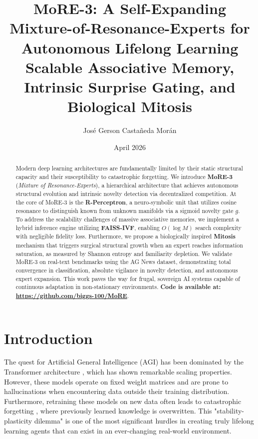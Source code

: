 \documentclass[11pt,hidelinks]{article}
\title{\LARGE\bfseries\textcolor{accent}{MoRE-3: A Self-Expanding Mixture-of-Resonance-Experts for Autonomous Lifelong Learning} \\
\large Scalable Associative Memory, Intrinsic Surprise Gating, and Biological Mitosis}
\author{
  José Gerson Castañeda Morán
}
\date{April 2026}
\begin{document}
\maketitle

\begin{abstract}
\noindent 
Modern deep learning architectures are fundamentally limited by their static structural capacity and their susceptibility to catastrophic forgetting. We introduce \textbf{MoRE-3} (\textit{Mixture of Resonance-Experts}), a hierarchical architecture that achieves autonomous structural evolution and intrinsic novelty detection via decentralized competition. At the core of MoRE-3 is the \textbf{R-Perceptron}, a neuro-symbolic unit that utilizes cosine resonance to distinguish known from unknown manifolds via a sigmoid novelty gate $g$. To address the scalability challenges of massive associative memories, we implement a hybrid inference engine utilizing \textbf{FAISS-IVF}, enabling $O(\log M)$ search complexity with negligible fidelity loss. Furthermore, we propose a biologically inspired \textbf{Mitosis} mechanism that triggers surgical structural growth when an expert reaches information saturation, as measured by Shannon entropy and familiarity depletion. We validate MoRE-3 on real-text benchmarks using the AG News dataset, demonstrating total convergence in classification, absolute vigilance in novelty detection, and autonomous expert expansion. This work paves the way for frugal, sovereign AI systems capable of continuous adaptation in non-stationary environments. \textbf{Code is available at: \url{https://github.com/biggs-100/MoRE}}.
\end{abstract}

\section{Introduction}
The quest for Artificial General Intelligence (AGI) has been dominated by the Transformer architecture \citep{vaswani2017attention}, which has shown remarkable scaling properties. However, these models operate on fixed weight matrices and are prone to hallucinations when encountering data outside their training distribution. Furthermore, retraining these models on new data often leads to catastrophic forgetting \citep{hopfield1982neural}, where previously learned knowledge is overwritten. This "stability-plasticity dilemma" is one of the most significant hurdles in creating truly lifelong learning agents that can exist in an ever-changing real-world environment.
\end{document}
